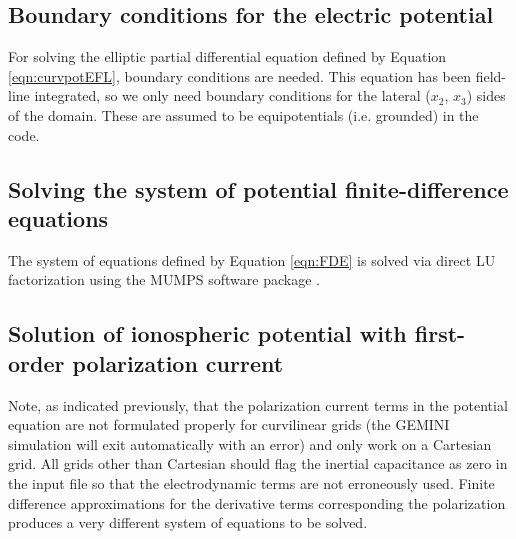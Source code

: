 \documentclass[11pt,letterpaper]{article}
\begin{document}
\subsection{Boundary conditions for the electric potential}

For solving the elliptic partial differential equation defined by Equation \ref{eqn:curvpotEFL}, boundary conditions are needed.  This equation has been field-line integrated, so we only need boundary conditions for the lateral ($x_2$, $x_3$) sides of the domain.  These are assumed to be equipotentials (i.e. grounded) in the code.  


\subsection{Solving the system of potential finite-difference equations}

The system of equations defined by Equation \ref{eqn:FDE} is solved via direct LU factorization using the MUMPS software package \citep{Amestoy:2001,Amestoy:2006}.


\subsection{Solution of ionospheric potential with first-order polarization current}

Note, as indicated previously, that the polarization current terms in the potential equation are not formulated properly for curvilinear grids (the GEMINI simulation will exit automatically with an error) and only work on a Cartesian grid.  All grids other than Cartesian should flag the inertial capacitance as zero in the input file so that the electrodynamic terms are not erroneously used.  Finite difference approximations for the derivative terms corresponding the polarization produces a very different system of equations to be solved.  
\end{document}
